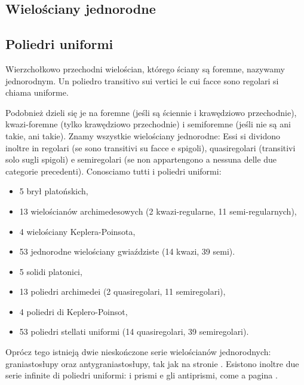 
%

\subsection{Wielościany jednorodne} %
\subsection{Poliedri uniformi} %

\begin{definition}
    Wierzchołkowo przechodni wielościan, którego ściany są foremne, nazywamy jednorodnym. %
    Un poliedro transitivo sui vertici le cui facce sono regolari si chiama uniforme. %
\end{definition}

Podobnież dzieli się je na foremne (jeśli są ściennie i krawędziowo przechodnie), kwazi-foremne (tylko krawędziowo przechodnie) i semiforemne (jeśli nie są ani takie, ani takie). %
Znamy wszystkie wielościany jednorodne: %
Essi si dividono inoltre in regolari (se sono transitivi su facce e spigoli), quasiregolari (transitivi solo sugli spigoli) e semiregolari (se non appartengono a nessuna delle due categorie precedenti). %
Conosciamo tutti i poliedri uniformi: %
\begin{itemize}
    \item 5 brył platońskich, %
    \item 13 wielościanów archimedesowych (2 kwazi-regularne, 11 semi-regularnych), %
    \item 4 wielościany Keplera-Poinsota, %
    \item 53 jednorodne wielościany gwiaździste (14 kwazi, 39 semi). %
    \item 5 solidi platonici, %
    \item 13 poliedri archimedei (2 quasiregolari, 11 semiregolari), %
    \item 4 poliedri di Keplero-Poinsot, %
    \item 53 poliedri stellati uniformi (14 quasiregolari, 39 semiregolari). %
\end{itemize}

Oprócz tego istnieją dwie nieskończone serie wielościanów jednorodnych: graniastosłupy oraz antygraniastosłupy, tak jak na stronie \pageref{dwie_serie}. %
Esistono inoltre due serie infinite di poliedri uniformi: i prismi e gli antiprismi, come a pagina \pageref{dwie_serie}. %

%